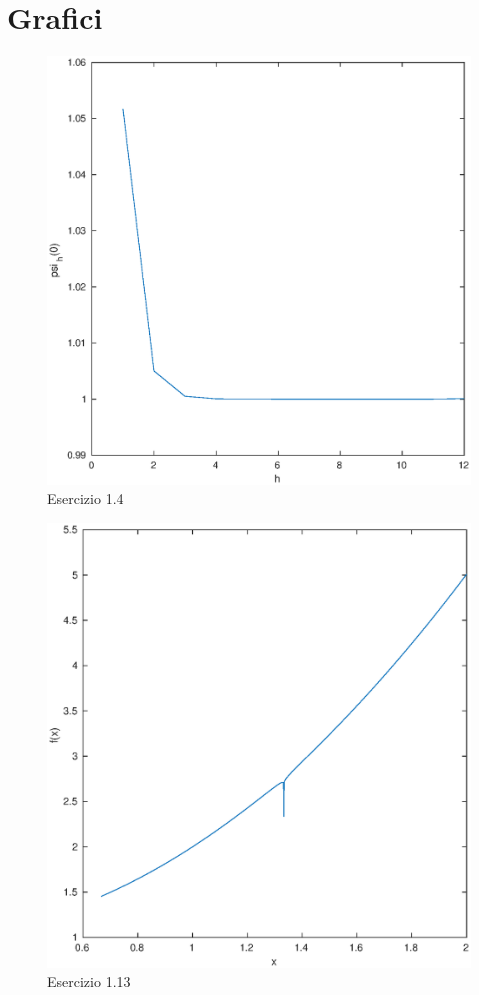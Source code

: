 \section{\textbf{Grafici}}
\begin{figure}[h]
\caption{Esercizio 1.4}
\label{fes14}
\includegraphics[width=\textwidth]{plot/fes14}
\end{figure}
\begin{figure}[h]
\caption{Esercizio 1.13}
\label{fes113}
\includegraphics[width=\textwidth]{plot/fes113}
\end{figure}
